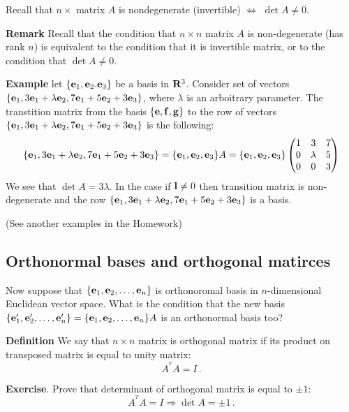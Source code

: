 \documentclass[12pt]{article}
\numberwithin{equation}{section}
\begin{document}
Recall that $n\times$ matrix $A$ is nondegenerate (invertible)
$\Leftrightarrow$ $\det A\not=0$.


\m

{\bf Remark}  Recall that  the condition that $n\times n$ matrix $A$ is non-degenerate
(has rank $n$) is equivalent to the condition that it is invertible matrix,
or to the condition that $\det A\not=0$.



{\bf Example}  let $\{{\bf e}_1,{\bf e}_2.{\bf e}_3\}$ 
be a basis in ${\bf R}^3$.
  Consider set of vectors 
$\{{\bf e}_1, 3{\bf e}_1+\lambda{\bf e}_2, 7{\bf e}_1+5{\bf e}_2+3{\bf e}_3\}$,
where $\lambda$ is an arboitrary parameter.
  The transtition matrix from the basis
  $\{{\bf e},{\bf f},{\bf g}\}$ to the row of vectors 
$\{{\bf e}_1, 3{\bf e}_1+\lambda{\bf e}_2, 
7{\bf e}_1+5{\bf e}_2+3{\bf e}_3\}$ is the following:
          \begin{equation*}
 \{{\bf e}_1, 3{\bf e}_1+\lambda{\bf e}_2, 7{\bf e}_1+5{\bf e}_2+3{\bf e}_3\}= 
  \{{\bf e}_1, {\bf e}_2, {\bf e}_3\}A=
  \{{\bf e}_1, {\bf e}_2, {\bf e}_3\}
   \begin{pmatrix}
       1 & 3   & 7\cr
       0 &\lambda & 5\cr
       0 & 0&   3
     \end{pmatrix}
           \end{equation*}
 We see that $\det A=3\lambda$. In the case if ${\bf l}\not=0$
then transition matrix is non-degenerate and
the row 
$\{{\bf e}_1, 3{\bf e}_1+\lambda{\bf e}_2, 7{\bf e}_1+5{\bf e}_2+3{\bf e}_3\}$
is a basis.

(See another examples in the Homework)

\subsection {Orthonormal bases and orthogonal matirces}

Now suppose that  $\{{\bf e}_1,{\bf e}_2,\dots,{\bf e}_n\}$ is orthonoromal basis 
in $n$-dimensional Euclidean
vector space.   What is the condition that  the new basis
$\{{\bf e}'_1,{\bf e}'_2,\dots,{\bf e}'_n\}=\{{\bf e}_1,{\bf e}_2,\dots,{\bf e}_n\}A$ is 
an orthonormal  basis too?

\m

{\bf Definition}  We say that $n\times n$ matrix is orthogonal matrix 
if its product on transposed matrix is equal to unity matrix:
                \begin{equation}\label{defofofthogonal}
                    A^{^T}A=I\,.
                \end{equation}

 {\bf Exercise}. Prove that determinant of 
orthogonal matrix is 
equal to $\pm 1$:
 \begin{equation}\label{defofofthogonal2}
                    A^{^T}A=I\Rightarrow \det A=\pm 1\,.
                \end{equation}
\end{document}
